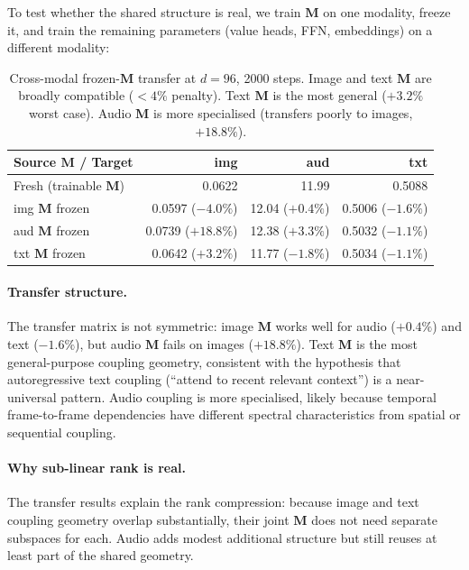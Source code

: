 \documentclass[11pt, a4paper]{article}
\newcommand{\M}{\mathbf{M}}
\theoremstyle{plain}
\theoremstyle{remark}
\begin{document}
To test whether the shared structure is real, we train $\M$ on one modality, freeze it, and train the remaining parameters (value heads, FFN, embeddings) on a different modality:

\begin{table}[h]
\centering
\small
\begin{tabular}{@{}lrrr@{}}
\toprule
\textbf{Source $\M$ / Target} & \textbf{img} & \textbf{aud} & \textbf{txt} \\
\midrule
Fresh (trainable $\M$) & 0.0622 & 11.99 & 0.5088 \\
img $\M$ frozen & 0.0597 ($-4.0\%$) & 12.04 ($+0.4\%$) & 0.5006 ($-1.6\%$) \\
aud $\M$ frozen & 0.0739 ($+18.8\%$) & 12.38 ($+3.3\%$) & 0.5032 ($-1.1\%$) \\
txt $\M$ frozen & 0.0642 ($+3.2\%$) & 11.77 ($-1.8\%$) & 0.5034 ($-1.1\%$) \\
\bottomrule
\end{tabular}
\caption{Cross-modal frozen-$\M$ transfer at $d{=}96$, 2000 steps.  Image and text $\M$ are broadly compatible ($< 4\%$ penalty).  Text $\M$ is the most general ($+3.2\%$ worst case).  Audio $\M$ is more specialised (transfers poorly to images, $+18.8\%$).}
\label{tab:frozen-transfer}
\end{table}

\paragraph{Transfer structure.}
The transfer matrix is not symmetric: image $\M$ works well for audio ($+0.4\%$) and text ($-1.6\%$), but audio $\M$ fails on images ($+18.8\%$).
Text $\M$ is the most general-purpose coupling geometry, consistent with the hypothesis that autoregressive text coupling (``attend to recent relevant context'') is a near-universal pattern.
Audio coupling is more specialised, likely because temporal frame-to-frame dependencies have different spectral characteristics from spatial or sequential coupling.

\paragraph{Why sub-linear rank is real.}
The transfer results explain the rank compression: because image and text coupling geometry overlap substantially, their joint $\M$ does not need separate subspaces for each.
Audio adds modest additional structure but still reuses at least part of the shared geometry.
\end{document}

